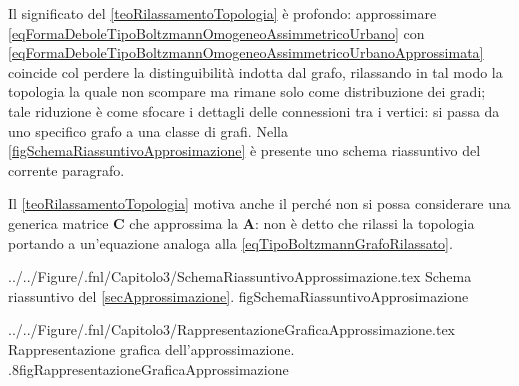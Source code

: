             Il significato del \cref{teoRilassamentoTopologia} è profondo: approssimare \ref{eqFormaDeboleTipoBoltzmannOmogeneoAssimmetricoUrbano} con \ref{eqFormaDeboleTipoBoltzmannOmogeneoAssimmetricoUrbanoApprossimata} coincide col perdere la distinguibilità indotta dal grafo, rilassando in tal modo la topologia la quale non scompare ma rimane solo come distribuzione dei gradi; tale riduzione è come sfocare i dettagli delle connessioni tra i vertici: si passa da uno specifico grafo a una classe di grafi. Nella \cref{figSchemaRiassuntivoApprosimazione} è presente uno schema riassuntivo del corrente paragrafo.

            \begin{oss}
                Il \cref{teoRilassamentoTopologia} motiva anche il perché non si possa considerare una generica matrice \(\mathbf C\) che approssima la \(\mathbf A\): non è detto che rilassi la topologia portando a un'equazione analoga alla \ref{eqTipoBoltzmannGrafoRilassato}.
            \end{oss}

                {../../Figure/.fnl/Capitolo3/SchemaRiassuntivoApprossimazione.tex}
                {Schema riassuntivo del \cref{secApprossimazione}.} 
                {\linewidth}{figSchemaRiassuntivoApprosimazione}

                {../../Figure/.fnl/Capitolo3/RappresentazioneGraficaApprossimazione.tex}
                {Rappresentazione grafica dell'approssimazione.}
                {.8\linewidth}{figRappresentazioneGraficaApprossimazione}
            
